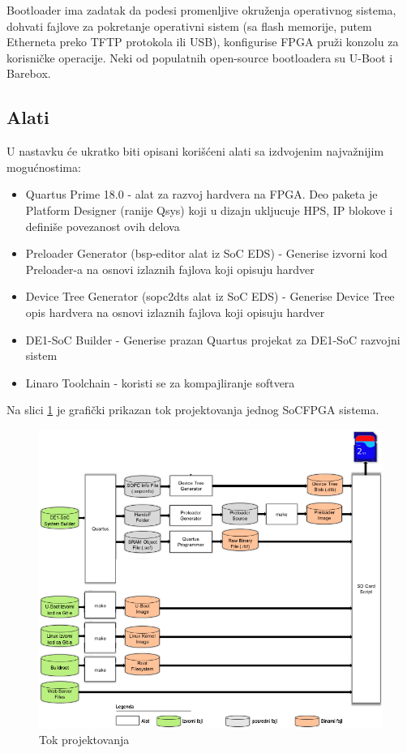 Bootloader ima zadatak da podesi promenljive okruženja operativnog sistema, dohvati fajlove za pokretanje operativni sistem (sa flash memorije, putem Etherneta preko TFTP protokola ili USB), konfigurise FPGA pruži konzolu za korisničke operacije. Neki od populatnih open-source bootloadera su U-Boot i Barebox.

\subsection{Alati}
U nastavku će ukratko biti opisani korišćeni alati sa izdvojenim najvažnijim mogućnostima:
\begin{itemize}
\item Quartus Prime 18.0 - alat za razvoj hardvera na FPGA. Deo paketa je Platform Designer (ranije Qsys) koji u dizajn ukljucuje HPS, IP blokove i definiše povezanost ovih delova
\item Preloader Generator (bsp-editor alat iz SoC EDS) - Generise izvorni kod Preloader-a na osnovi izlaznih fajlova koji opisuju hardver
\item Device Tree Generator (sopc2dts alat iz SoC EDS) - Generise Device Tree opis hardvera na osnovi izlaznih fajlova koji opisuju hardver
\item DE1-SoC Builder - Generise prazan Quartus projekat za DE1-SoC razvojni sistem
\item Linaro Toolchain - koristi se za kompajliranje softvera
\end{itemize}

Na slici \ref{slika1:gsrd} je grafički prikazan tok projektovanja jednog SoCFPGA sistema.

\begin{figure}[h!]
\centering
\includegraphics[scale=1.3]{img/gsrd-flow.png}
\caption{Tok projektovanja}
\label{slika1:gsrd}
\end{figure}

